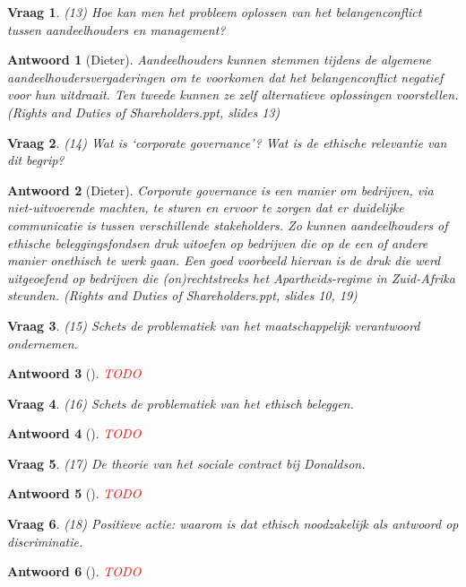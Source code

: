\documentclass{article}
\theoremstyle{nonumberplain}
\newtheorem{question}{Vraag}
\newtheorem{answer}{Antwoord}
\begin{document}
\begin{question}
(13)	Hoe kan men het probleem oplossen van het belangenconflict tussen aandeelhouders en management?  
\end{question}
\begin{answer}[Dieter]
	Aandeelhouders kunnen stemmen tijdens de algemene aandeelhoudersvergaderingen om te voorkomen dat het belangenconflict negatief voor hun uitdraait. 
	Ten tweede kunnen ze zelf alternatieve oplossingen voorstellen.
	\textit{(Rights and Duties of Shareholders.ppt, slides 13)}
\end{answer}

\begin{question}
(14)	Wat is `corporate governance'? Wat is de ethische relevantie van dit begrip?  
\end{question}
\begin{answer}[Dieter]
	\emph{Corporate governance} is een manier om bedrijven, via niet-uitvoerende machten, te sturen en ervoor te zorgen dat er duidelijke communicatie is tussen verschillende stakeholders.
	Zo kunnen aandeelhouders of ethische beleggingsfondsen druk uitoefen op bedrijven die op de een of andere manier onethisch te werk gaan. Een goed voorbeeld hiervan is de druk die werd uitgeoefend op bedrijven die (on)rechtstreeks het Apartheids-regime in Zuid-Afrika steunden.
	\textit{(Rights and Duties of Shareholders.ppt, slides 10, 19)}
\end{answer}

\begin{question}
(15)	Schets de problematiek van het maatschappelijk verantwoord ondernemen.
\end{question}
\begin{answer}[]
\textcolor{red}{TODO}%
\end{answer}

\begin{question}
(16)	Schets de problematiek van het ethisch beleggen.
\end{question}
\begin{answer}[]
\textcolor{red}{TODO}%
\end{answer}

\begin{question}
(17)	De theorie van het sociale contract bij Donaldson. 
\end{question}
\begin{answer}[]
\textcolor{red}{TODO}%
\end{answer}

\begin{question}
(18)	Positieve actie: waarom is dat ethisch noodzakelijk als antwoord op discriminatie.
\end{question}
\begin{answer}[]
\textcolor{red}{TODO}%
\end{answer}
\end{document}
